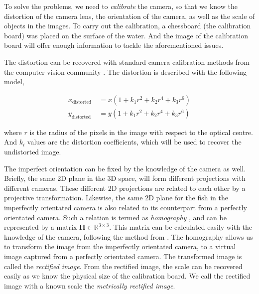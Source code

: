 \documentclass[11pt,twoside]{report}
\begin{document}
To solve the problems, we need to \emph{calibrate} the camera, so that we know the distortion of the camera lens, the orientation of the camera, as well as the scale of objects in the images. To carry out the calibration, a chessboard (the calibration board) was placed on the surface of the water. And the image of the calibration board will offer enough information to tackle the aforementioned issues. 

The distortion can be recovered with standard camera calibration methods
from the computer vision community \cite{ma2005, hartley2003}. The distortion is described with the following model,

$$
\begin{aligned}
x_{\text {distorted }} &= x\left(1+k_{1} r^{2}+k_{2} r^{4}+k_{3} r^{6}\right) \\
y_{\text {distorted }} &= y\left(1+k_{1} r^{2}+k_{2} r^{4}+k_{3} r^{6}\right)
\end{aligned}
$$

\noindent where $r$ is the radius of the pixels in the image with respect to the optical centre. And $k_i$ values are the distortion coefficients, which will be used to recover the undistorted image.


The imperfect orientation can be fixed by the knowledge of the camera as well. Briefly, the same 2D plane in the 3D space, will form different projections with different cameras. 
These different 2D projections are related to each other by a projective transformation.
Likewise, the same 2D plane for the fish in the imperfectly orientated camera is also related to its counterpart from a perfectly orientated camera.
Such a relation is termed as \emph{homography}
, and can be represented by a matrix
$\mathbf{H} \in \mathbb{R}^{3 \times 3}$. This matrix can be calculated easily with the knowledge of the camera, following the method from \citeauthor{hartley2003} \cite{hartley2003}.
The homography allows us to transform the image from the imperfectly orientated camera, to a virtual image captured from a perfectly orientated camera. The transformed image is called the \emph{rectified image}.
From the rectified image, the scale can be recovered easily as we know the physical size of the calibration board. We call the rectified image with a known scale the \emph{metrically rectified image}.
\end{document}
